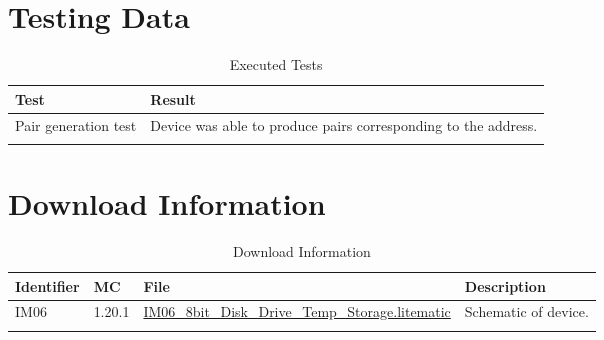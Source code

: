 \documentclass[10pt]{datasheet}
\begin{document}
\section{Testing Data}
\begin{table}[H]
\caption{Executed Tests}
\begin{tabularx}{\textwidth}{l | X}
    \thickhline
    \textbf{Test} & \textbf{Result} \\
    \hline
    Pair generation test & Device was able to produce pairs corresponding to the address. \\
    \thickhline
\end{tabularx}
\end{table}

\section{Download Information}
\begin{table}[H]
    \caption{Download Information}
    \begin{tabularx}{\textwidth}{l | l | l | X}
        \thickhline
        \textbf{Identifier} & \textbf{MC} & \textbf{File} & \textbf{Description} \\
        \hline
        IM06 & 1.20.1 & \href{https://github.com/Soontech-Annals/Archive/blob/b56572c0d2b4f182d9e9d41449d8cb2963b923ae/Archive/item-memory/IM06\%208bit\%20Disk\%20Drive\%20Temp\%20Storage/IM06\_8bit\_Disk\_Drive\_Temp\_Storage.litematic?raw=1}{IM06\_8bit\_Disk\_Drive\_Temp\_Storage.litematic} & Schematic of device. \\
        \hline
        \thickhline
    \end{tabularx}
\end{table}
\end{document}
